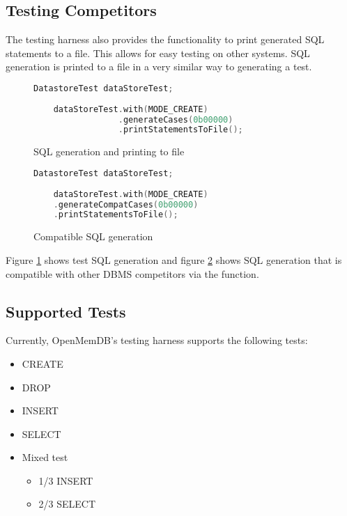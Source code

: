 \documentclass[letterpaper, 11pt]{article}
\begin{document}
\subsection{Testing Competitors}

The testing harness also provides the functionality to print generated SQL statements to a file. This allows for easy testing on other systems. SQL generation is printed to a file in a very similar way to generating a test. 
  
  \begin{figure}[H]
  	\begin{lstlisting}[language=C++]
  	DatastoreTest dataStoreTest;
  	
  	dataStoreTest.with(MODE_CREATE)
				 .generateCases(0b00000)
				 .printStatementsToFile();
  	\end{lstlisting}
  	\caption{SQL generation and printing to file}
  	\label{testharnessprint}
  \end{figure}
 
 
  \begin{figure}[H]
  	\begin{lstlisting}[language=C++]
  	DatastoreTest dataStoreTest;
  	
  	dataStoreTest.with(MODE_CREATE)
  	.generateCompatCases(0b00000)
  	.printStatementsToFile();
  	\end{lstlisting}
  	\caption{Compatible SQL generation}
  	\label{testharnessprintcompat}
  \end{figure}
  
  
  Figure \ref{testharnessprint} shows test SQL generation and figure \ref{testharnessprintcompat} shows SQL generation that is compatible with other DBMS competitors via the  function.

\subsection{Supported Tests}

Currently, OpenMemDB's testing harness supports the following tests:

\begin{itemize}
	\item CREATE
	\item DROP
	\item INSERT
	\item SELECT
	\item Mixed test
	\begin{itemize}
		\item 1/3 INSERT
		\item 2/3 SELECT
	\end{itemize}
\end{itemize}
\end{document}
